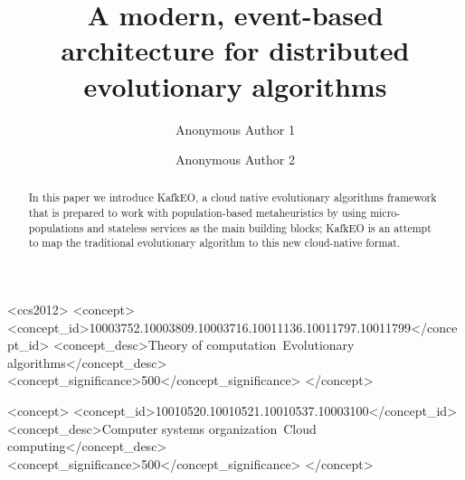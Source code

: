 \documentclass[sigconf]{acmart}
\begin{document}
\title{A modern, event-based architecture for distributed evolutionary algorithms}

\author{Anonymous Author 1}

\author{Anonymous Author 2}

\renewcommand{\shortauthors}{A. Author et al.}


\begin{abstract}
In this paper we introduce KafkEO, a cloud native evolutionary algorithms
framework that is prepared to work with population-based metaheuristics by using
micro-populations and stateless services as the main building
blocks; KafkEO is an attempt to map the traditional evolutionary
algorithm to this new cloud-native format.
\end{abstract}

\begin{CCSXML}
<ccs2012>
<concept>
<concept_id>10003752.10003809.10003716.10011136.10011797.10011799</concept_id>
<concept_desc>Theory of computation~Evolutionary algorithms</concept_desc>
<concept_significance>500</concept_significance>
</concept>

<concept>
<concept_id>10010520.10010521.10010537.10003100</concept_id>
<concept_desc>Computer systems organization~Cloud computing</concept_desc>
<concept_significance>500</concept_significance>
</concept>
\end{CCSXML}






\end{document}
